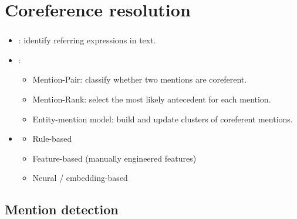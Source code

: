 \documentclass[xcolor=table]{beamer}
\begin{document}
\section{Coreference resolution}

\begin{frame}
	\frametitle{\insertshortsubtitle}
	\framesubtitle{\insertsection}
	
	
	\begin{itemize}
		\item {}: identify referring expressions in text.
		\item {}:
		\begin{itemize}
			\item Mention-Pair: classify whether two mentions are coreferent.
			
			\item Mention-Rank: select the most likely antecedent for each mention.
			
			\item Entity-mention model: build and update clusters of coreferent mentions.
			
		\end{itemize}
		
		\item {}
		\begin{itemize}
			\item Rule-based
			\item Feature-based (manually engineered features)
			\item Neural / embedding-based
		\end{itemize}
		
	\end{itemize}
	
\end{frame}


\subsection{Mention detection}
\end{document}
